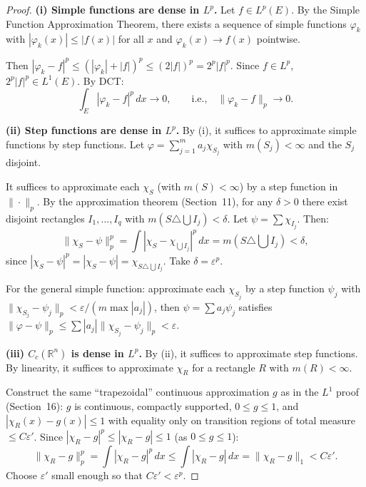 \documentclass[11pt]{report}
\begin{document}
\begin{proof}\leavevmode

\textbf{(i) Simple functions are dense in $L^p$.} Let $f \in L^p(E)$. By the Simple Function Approximation Theorem, there exists a sequence of simple functions $\varphi_k$ with $|\varphi_k(x)| \leq |f(x)|$ for all $x$ and $\varphi_k(x) \to f(x)$ pointwise.

Then $|\varphi_k - f|^p \leq (|\varphi_k| + |f|)^p \leq (2|f|)^p = 2^p|f|^p$. Since $f \in L^p$, $2^p|f|^p \in L^1(E)$. By DCT:
\[
\int_E |\varphi_k - f|^p\,dx \to 0, \qquad \text{i.e.,} \quad \|\varphi_k - f\|_p \to 0.
\]

\textbf{(ii) Step functions are dense in $L^p$.} By (i), it suffices to approximate simple functions by step functions. Let $\varphi = \sum_{j=1}^{m} a_j \chi_{S_j}$ with $m(S_j) < \infty$ and the $S_j$ disjoint.

It suffices to approximate each $\chi_S$ (with $m(S) < \infty$) by a step function in $\|\cdot\|_p$. By the approximation theorem (Section~11), for any $\delta > 0$ there exist disjoint rectangles $I_1, \ldots, I_q$ with $m(S \triangle \bigcup I_j) < \delta$. Let $\psi = \sum \chi_{I_j}$. Then:
\[
\|\chi_S - \psi\|_p^p = \int |\chi_S - \chi_{\bigcup I_j}|^p\,dx = m(S \triangle \textstyle\bigcup I_j) < \delta,
\]
since $|\chi_S - \psi|^p = |\chi_S - \psi| = \chi_{S \triangle \bigcup I_j}$. Take $\delta = \varepsilon^p$.

For the general simple function: approximate each $\chi_{S_j}$ by a step function $\psi_j$ with $\|\chi_{S_j} - \psi_j\|_p < \varepsilon/(m \max |a_j|)$, then $\psi = \sum a_j \psi_j$ satisfies $\|\varphi - \psi\|_p \leq \sum |a_j| \|\chi_{S_j} - \psi_j\|_p < \varepsilon$.

\textbf{(iii) $C_c(\mathbb{R}^n)$ is dense in $L^p$.} By (ii), it suffices to approximate step functions. By linearity, it suffices to approximate $\chi_R$ for a rectangle $R$ with $m(R) < \infty$.

Construct the same ``trapezoidal'' continuous approximation $g$ as in the $L^1$ proof (Section~16): $g$ is continuous, compactly supported, $0 \leq g \leq 1$, and $|\chi_R(x) - g(x)| \leq 1$ with equality only on transition regions of total measure $\leq C\varepsilon'$. Since $|\chi_R - g|^p \leq |\chi_R - g| \leq 1$ (as $0 \leq g \leq 1$):
\[
\|\chi_R - g\|_p^p = \int |\chi_R - g|^p\,dx \leq \int |\chi_R - g|\,dx = \|\chi_R - g\|_1 < C\varepsilon'.
\]
Choose $\varepsilon'$ small enough so that $C\varepsilon' < \varepsilon^p$.
\end{proof}
\end{document}
